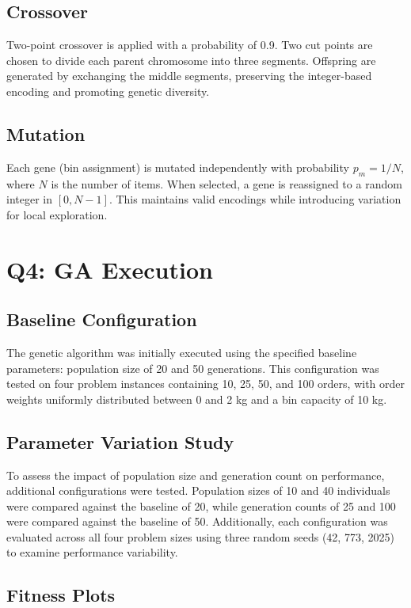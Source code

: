 \documentclass[journal,12pt,onecolumn]{IEEEtran}
\begin{document}
\subsection{Crossover}

Two-point crossover is applied with a probability of 0.9. Two cut points are chosen to divide each parent chromosome into three segments. Offspring are generated by exchanging the middle segments, preserving the integer-based encoding and promoting genetic diversity.

\subsection{Mutation}

Each gene (bin assignment) is mutated independently with probability $p_m = 1/N$, where $N$ is the number of items. When selected, a gene is reassigned to a random integer in $[0, N-1]$. This maintains valid encodings while introducing variation for local exploration.

\section{Q4: GA Execution}

\subsection{Baseline Configuration}

The genetic algorithm was initially executed using the specified baseline parameters: population size of 20 and 50 generations. This configuration was tested on four problem instances containing 10, 25, 50, and 100 orders, with order weights uniformly distributed between 0 and 2 kg and a bin capacity of 10 kg.

\subsection{Parameter Variation Study}

To assess the impact of population size and generation count on performance, additional configurations were tested. Population sizes of 10 and 40 individuals were compared against the baseline of 20, while generation counts of 25 and 100 were compared against the baseline of 50. Additionally, each configuration was evaluated across all four problem sizes using three random seeds (42, 773, 2025) to examine performance variability.

\subsection{Fitness Plots}
\end{document}
